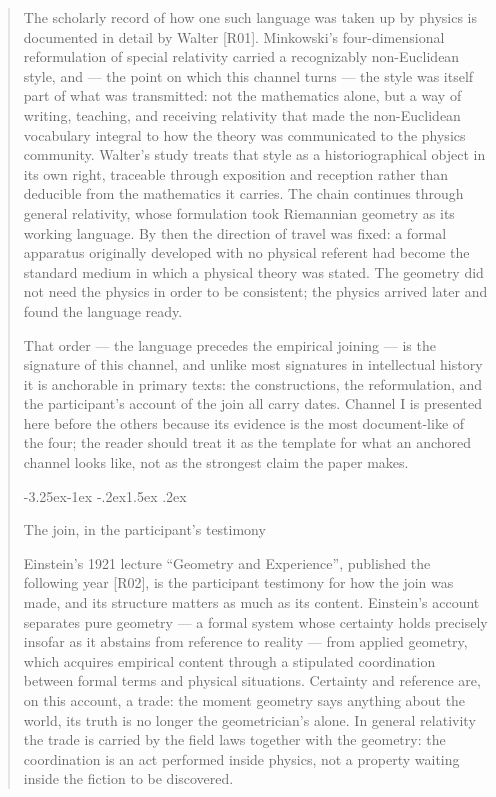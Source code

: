 \documentclass[11pt,a4paper]{article}
\makeatletter
\renewcommand\subsection{\@startsection{subsection}{2}{\z@}%
  {-3.25ex\@plus -1ex \@minus -.2ex}{1.5ex \@plus .2ex}%
  {\normalfont\large\bfseries\raggedright}}
\makeatother
\begin{document}
\begin{abstract}
The scholarly record of how one such language was taken up by physics is documented in detail by Walter [R01]. Minkowski's four-dimensional reformulation of special relativity carried a recognizably non-Euclidean style, and — the point on which this channel turns — the style was itself part of what was transmitted: not the mathematics alone, but a way of writing, teaching, and receiving relativity that made the non-Euclidean vocabulary integral to how the theory was communicated to the physics community. Walter's study treats that style as a historiographical object in its own right, traceable through exposition and reception rather than deducible from the mathematics it carries. The chain continues through general relativity, whose formulation took Riemannian geometry as its working language. By then the direction of travel was fixed: a formal apparatus originally developed with no physical referent had become the standard medium in which a physical theory was stated. The geometry did not need the physics in order to be consistent; the physics arrived later and found the language ready.

That order — the language precedes the empirical joining — is the signature of this channel, and unlike most signatures in intellectual history it is anchorable in primary texts: the constructions, the reformulation, and the participant's account of the join all carry dates. Channel I is presented here before the others because its evidence is the most document-like of the four; the reader should treat it as the template for what an anchored channel looks like, not as the strongest claim the paper makes.

\subsection{The join, in the participant's testimony}

Einstein's 1921 lecture ``Geometry and Experience'', published the following year [R02], is the participant testimony for how the join was made, and its structure matters as much as its content. Einstein's account separates pure geometry — a formal system whose certainty holds precisely insofar as it abstains from reference to reality — from applied geometry, which acquires empirical content through a stipulated coordination between formal terms and physical situations. Certainty and reference are, on this account, a trade: the moment geometry says anything about the world, its truth is no longer the geometrician's alone. In general relativity the trade is carried by the field laws together with the geometry: the coordination is an act performed inside physics, not a property waiting inside the fiction to be discovered.


\end{abstract}
\end{document}
